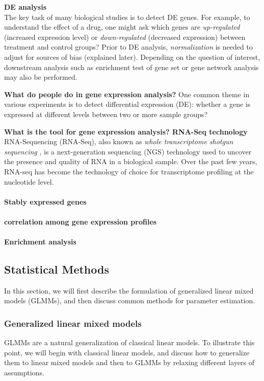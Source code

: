 	
	\textbf{DE analysis}\\
		The key task of many biological studies is to detect DE genes. For example, to understand the effect of a drug, one might ask which genes are \textit{up-regulated} (increased expression level) or \textit{down-regulated} (decreased expression) between treatment and control groups? Prior to DE analysis, \textit{normalization} is needed to adjust for sources of bias (explained later). Depending on the question of interest, downstream analysis such as enrichment test of gene set or gene network analysis may also be performed. 
		
	
	\textbf{What do people do in gene expression analysis?}
	 One common theme in various experiments is to detect differential expression (DE):  whether a gene is expressed at different levels between two or more sample groups? 

	
	\textbf{What is the tool for gene expression analysis? RNA-Seq technology}\\
	RNA-Sequencing (RNA-Seq), also known as \textit{whole transcriptome shotgun sequencing} \citep{morin2008profiling}, is a next-generation sequencing (NGS) technology used to uncover the presence and quality of RNA in a biological sample. Over the past few years, RNA-seq has become the technology of choice for transcriptome profiling  at the nucleotide level.  
		
	
	\paragraph{Stably expressed genes}
	
	\paragraph{correlation among gene expression profiles}
	
	\paragraph{Enrichment analysis}
	
	
\subsection{Statistical Methods}\label{subsec:glmm}
	In this section, we will first describe the formulation of generalized linear mixed models (GLMMs), and then discuss common methods for parameter estimation. 
	\subsubsection{Generalized linear mixed models}\label{subsubsec:intro-stat-framework}
	GLMMs are a natural generalization of classical linear models. To illustrate this point, we will begin with classical linear models, and discuss how to generalize them to linear mixed models and then to GLMMs by relaxing different layers of assumptions. 
